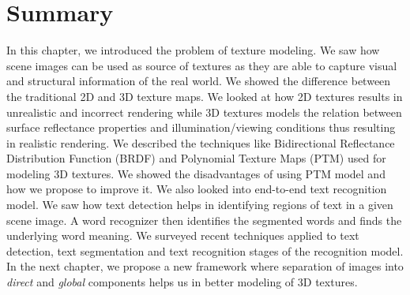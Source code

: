 \section{Summary}
In this chapter, we introduced the problem of texture modeling.
We saw how scene images can be used as source of textures as they are able to
capture visual and structural information of the real world.
We showed the difference between the traditional 2D and 3D texture maps. 
We looked at how 2D textures results in unrealistic and incorrect rendering 
while 3D textures models the relation between surface
reflectance properties and illumination/viewing conditions thus resulting in realistic rendering.
We described the techniques like Bidirectional Reflectance Distribution
Function (BRDF) and Polynomial Texture Maps (PTM) used for modeling 3D textures.
We showed the disadvantages of using PTM model and how we propose to improve it.
We also looked into end-to-end text recognition model.
We saw how text detection helps in identifying regions of text in a
given scene image. A word recognizer then identifies the segmented words and finds
the underlying word meaning. We surveyed recent techniques applied to text detection, text segmentation 
and text recognition stages of the recognition model.
In the next chapter,
we propose a new framework where separation of images 
into {\em direct} and {\em global} components helps us in better modeling of 3D textures.
